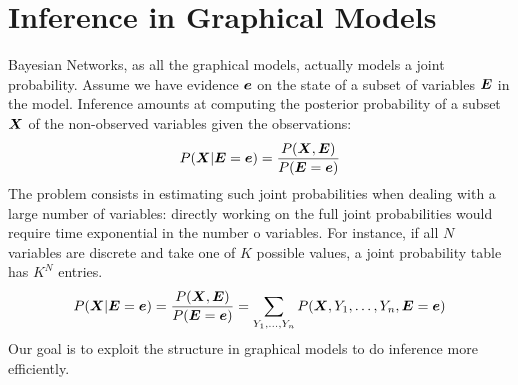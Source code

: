 \section{Inference in Graphical Models}
Bayesian Networks, as all the graphical models, actually models a joint probability. \newline
Assume we have evidence $\bm{e}$ on the state of a subset of variables $\bm{E}$ in the model. Inference amounts at computing the posterior probability of a subset $\bm{X}$ of the non-observed variables given the observations:
\[P(\bm{X}\vert\bm{E}=\bm{e})=\dfrac{P(\bm{X}, \bm{E})}{P(\bm{E}=\bm{e})}\]
The problem consists in estimating such joint probabilities when dealing with a large number of variables: directly working on the full joint probabilities would require time exponential in the number o variables. For instance, if all $N$ variables are discrete and take one of $K$ possible values, a joint probability table has $K^N$ entries. 
\[P(\bm{X}\vert\bm{E}=\bm{e})=\dfrac{P(\bm{X}, \bm{E})}{P(\bm{E}=\bm{e})}=\displaystyle\sum_{Y_1,\hdots,Y_n}P(\bm{X},Y_1,\hdots,Y_n,\bm{E}=\bm{e})\]
Our goal is to exploit the structure in graphical models to do inference more efficiently.
%
%
